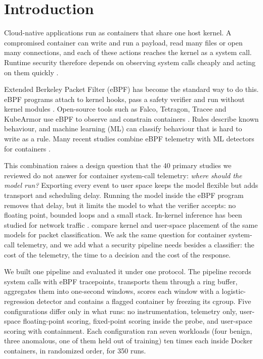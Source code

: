 \section{Introduction}
\label{sec:intro}

Cloud-native applications run as containers that share one host kernel. A compromised container can write and run a payload, read many files or open many connections, and each of these actions reaches the kernel as a system call. Runtime security therefore depends on observing system calls cheaply and acting on them quickly \parencite{R048,R049}.

Extended Berkeley Packet Filter (eBPF) has become the standard way to do this. eBPF programs attach to kernel hooks, pass a safety verifier and run without kernel modules \parencite{P007}. Open-source tools such as Falco, Tetragon, Tracee and KubeArmor use eBPF to observe and constrain containers \parencite{P001,P040}. Rules describe known behaviour, and machine learning (ML) can classify behaviour that is hard to write as a rule. Many recent studies combine eBPF telemetry with ML detectors for containers \parencite{P005,P006,P016,P018,P034}.

This combination raises a design question that the 40 primary studies we reviewed do not answer for container system-call telemetry: \emph{where should the model run?} Exporting every event to user space keeps the model flexible but adds transport and scheduling delay. Running the model inside the eBPF program removes that delay, but it limits the model to what the verifier accepts: no floating point, bounded loops and a small stack. In-kernel inference has been studied for network traffic \parencite{P012,P014,P031}. \textcite{P012} compare kernel and user-space placement of the same models for packet classification. We ask the same question for container system-call telemetry, and we add what a security pipeline needs besides a classifier: the cost of the telemetry, the time to a decision and the cost of the response.

We built one pipeline and evaluated it under one protocol. The pipeline records system calls with eBPF tracepoints, transports them through a ring buffer, aggregates them into one-second windows, scores each window with a logistic-regression detector and contains a flagged container by freezing its cgroup. Five configurations differ only in what runs: no instrumentation, telemetry only, user-space floating-point scoring, fixed-point scoring inside the probe, and user-space scoring with containment. Each configuration ran seven workloads (four benign, three anomalous, one of them held out of training) ten times each inside Docker containers, in randomized order, for 350 runs.

